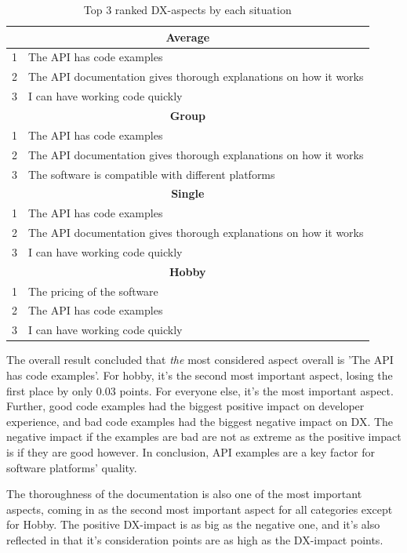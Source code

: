 \documentclass{article}
\begin{document}
\begin{table}[H]
\centering
\begin{tabular}{r l}
\hline\hline
\multicolumn{2}{c}{\textbf{Average}} \\ \hline
1 &The API has code examples \\
2 & The API documentation gives thorough explanations on how it works \\
3 &I can have working code quickly \\
\hline\hline
\multicolumn{2}{c}{\textbf{Group}} \\ \hline
1 & The API has code examples                                        \\
2 & The API documentation gives thorough explanations on how it works \\
3 & The software is compatible with different platforms              \\
\hline\hline
\multicolumn{2}{c}{\textbf{Single}} \\ \hline
1 & The API has code examples                                         \\
2 & The API documentation gives thorough explanations on how it works  \\
3 & I can have working code quickly                                   \\
\hline\hline
\multicolumn{2}{c}{\textbf{Hobby}} \\ \hline
1 & The pricing of the software    \\
2 & The API has code examples       \\
3 & I can have working code quickly\\ \hline
\end{tabular}
\caption{Top 3 ranked DX-aspects by each situation}
\label{tab:my_label}
\end{table}


The overall result concluded that \textit{the} most considered aspect overall
is 'The API has code examples'. For hobby, it's the second most
important aspect, losing the first place by only 0.03 points. For
everyone else, it's the most important aspect. Further, good code
examples had the biggest positive impact on developer experience, and
bad code examples had the biggest negative impact on DX. The negative
impact if the examples are bad are not as extreme as the positive impact
is if they are good however. In conclusion, API examples are a key
factor for software platforms' quality.

The thoroughness of the documentation is also one of the most important
aspects, coming in as the second most important aspect for all
categories except for Hobby. The positive DX-impact is as big as the
negative one, and it's also reflected in that it's consideration points
are as high as the DX-impact points.
\end{document}
